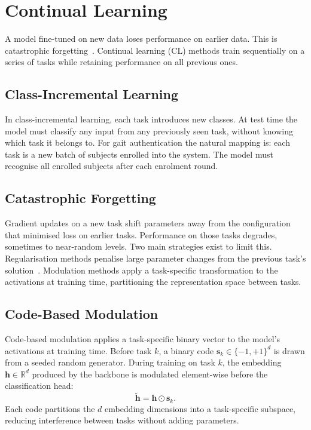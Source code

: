 \section{Continual Learning}
\label{sec:bg_cl}

A model fine-tuned on new data loses performance on earlier data. This is catastrophic forgetting~\cite{mccloskey1989catastrophic}. Continual learning (CL) methods train sequentially on a series of tasks while retaining performance on all previous ones.

\subsection{Class-Incremental Learning}
\label{ssec:bg_cl_incremental}

In class-incremental learning, each task introduces new classes. At test time the model must classify any input from any previously seen task, without knowing which task it belongs to. For gait authentication the natural mapping is: each task is a new batch of subjects enrolled into the system. The model must recognise all enrolled subjects after each enrolment round.

\subsection{Catastrophic Forgetting}
\label{ssec:bg_forgetting}

Gradient updates on a new task shift parameters away from the configuration that minimised loss on earlier tasks. Performance on those tasks degrades, sometimes to near-random levels. Two main strategies exist to limit this. Regularisation methods penalise large parameter changes from the previous task's solution~\cite{kirkpatrick2017overcoming}. Modulation methods apply a task-specific transformation to the activations at training time, partitioning the representation space between tasks.

\subsection{Code-Based Modulation}
\label{ssec:bg_cdml}

Code-based modulation applies a task-specific binary vector to the model's activations at training time. Before task $k$, a binary code $\mathbf{s}_k \in \{-1, +1\}^{d}$ is drawn from a seeded random generator. During training on task $k$, the embedding $\mathbf{h} \in \mathbb{R}^d$ produced by the backbone is modulated element-wise before the classification head:
\begin{equation}
  \tilde{\mathbf{h}} = \mathbf{h} \odot \mathbf{s}_k.
  \label{eq:cdml_mod}
\end{equation}
Each code partitions the $d$ embedding dimensions into a task-specific subspace, reducing interference between tasks without adding parameters.

